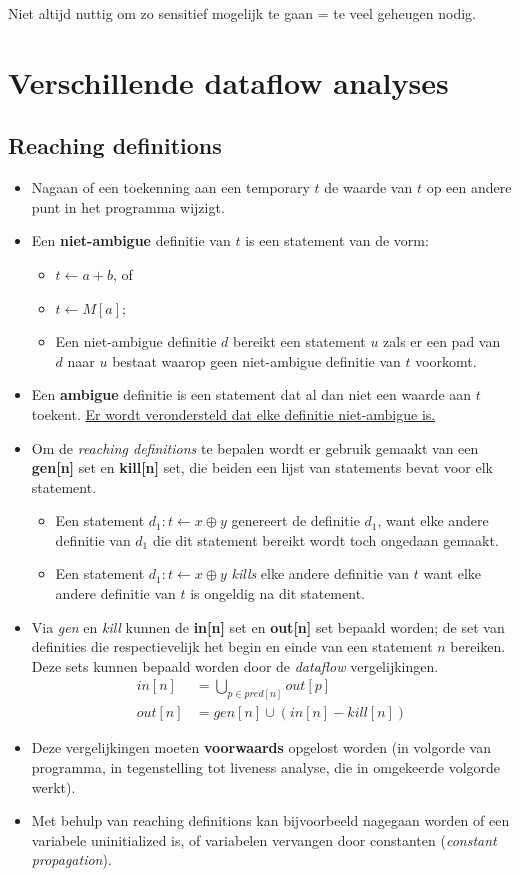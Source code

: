 Niet altijd nuttig om zo sensitief mogelijk te gaan = te veel geheugen nodig.


\section{Verschillende dataflow analyses}
\subsection{Reaching definitions}
\begin{itemize}
	\item Nagaan of een toekenning aan een temporary $t$ de waarde van $t$ op een andere punt in het programma wijzigt.
	\item Een \textbf{niet-ambigue} definitie van $t$ is een statement van de vorm:
	\begin{itemize}
		\item $t \leftarrow a + b$, of 
		\item $t \leftarrow M[a]$;
		\item Een niet-ambigue definitie $d$ bereikt een statement $u$ zals er een pad van $d$ naar $u$ bestaat waarop geen niet-ambigue definitie van $t$ voorkomt.

	\end{itemize}
	\item Een \textbf{ambigue} definitie is een statement dat al dan niet een waarde aan $t$ toekent. \uline{Er wordt verondersteld dat elke definitie niet-ambigue is.}
	\item Om de \textit{reaching definitions} te bepalen wordt er gebruik gemaakt van een \textbf{gen[n]} set en \textbf{kill[n]} set, die beiden een lijst van statements bevat voor elk statement.
	\begin{itemize}
		\item Een statement $d_1 : t \leftarrow x \oplus y$ genereert de definitie $d_1$, want elke andere definitie van $d_1$ die dit statement bereikt wordt toch ongedaan gemaakt.
		\item Een statement $d_1 : t \leftarrow x \oplus y$ \textit{kills} elke andere definitie van $t$ want elke andere definitie van $t$ is ongeldig na dit statement.
	\end{itemize}
	\item Via \textit{gen} en \textit{kill} kunnen de \textbf{in[n]} set en \textbf{out[n]} set bepaald worden; de set van definities die respectievelijk het begin en einde van een statement $n$ bereiken. Deze sets kunnen bepaald worden door de \textit{dataflow} vergelijkingen.
	\begin{align*}
		in[n] & = \bigcup_{p \in pred[n]} out[p] \\
		out[n] & = gen[n] \cup (in[n] - kill[n])
	\end{align*}
	\item Deze vergelijkingen moeten \textbf{voorwaards} opgelost worden (in volgorde van programma, in tegenstelling tot liveness analyse, die in omgekeerde volgorde werkt).
	\item Met behulp van reaching definitions kan bijvoorbeeld nagegaan worden of een variabele uninitialized is, of variabelen vervangen door constanten (\textit{constant propagation}).


\end{itemize}

